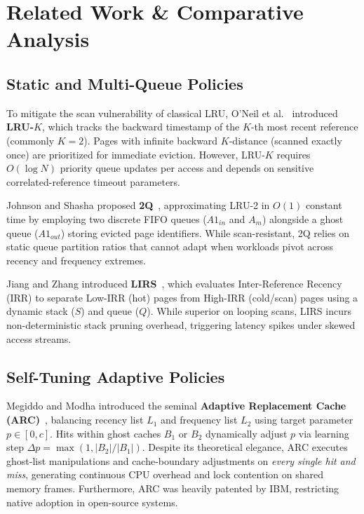 \documentclass[conference]{IEEEtran}
\begin{document}
\section{Related Work \& Comparative Analysis}

\subsection{Static and Multi-Queue Policies}
To mitigate the scan vulnerability of classical LRU, O'Neil et al.~\cite{oneil1993lruk} introduced \textbf{LRU-$K$}, which tracks the backward timestamp of the $K$-th most recent reference (commonly $K=2$). Pages with infinite backward $K$-distance (scanned exactly once) are prioritized for immediate eviction. However, LRU-$K$ requires $O(\log N)$ priority queue updates per access and depends on sensitive correlated-reference timeout parameters.

Johnson and Shasha proposed \textbf{2Q}~\cite{johnson1994twoq}, approximating LRU-2 in $O(1)$ constant time by employing two discrete FIFO queues ($A1_{in}$ and $A_{m}$) alongside a ghost queue ($A1_{out}$) storing evicted page identifiers. While scan-resistant, 2Q relies on static queue partition ratios that cannot adapt when workloads pivot across recency and frequency extremes.

Jiang and Zhang introduced \textbf{LIRS}~\cite{jiang2002lirs}, which evaluates Inter-Reference Recency (IRR) to separate Low-IRR (hot) pages from High-IRR (cold/scan) pages using a dynamic stack ($S$) and queue ($Q$). While superior on looping scans, LIRS incurs non-deterministic stack pruning overhead, triggering latency spikes under skewed access streams.

\subsection{Self-Tuning Adaptive Policies}
Megiddo and Modha introduced the seminal \textbf{Adaptive Replacement Cache (ARC)}~\cite{megiddo2003arc}, balancing recency list $L_1$ and frequency list $L_2$ using target parameter $p \in [0, c]$. Hits within ghost caches $B_1$ or $B_2$ dynamically adjust $p$ via learning step $\Delta p = \max(1, |B_2|/|B_1|)$. Despite its theoretical elegance, ARC executes ghost-list manipulations and cache-boundary adjustments on \textit{every single hit and miss}, generating continuous CPU overhead and lock contention on shared memory frames. Furthermore, ARC was heavily patented by IBM, restricting native adoption in open-source systems.
\end{document}
